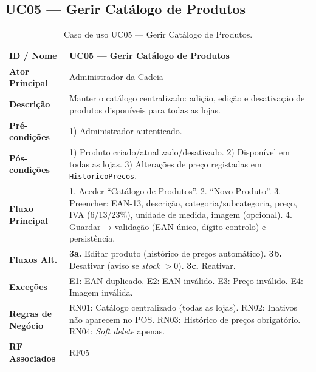 \documentclass[a4paper,12pt]{scrreprt}
\begin{document}
\subsection*{UC05 --- Gerir Catálogo de Produtos}
\begin{table}[H]
\centering\small
\begin{tabular}{|p{3cm}|p{11cm}|}
\hline
\textbf{ID / Nome} & UC05 --- Gerir Catálogo de Produtos \\
\hline
\textbf{Ator Principal} & Administrador da Cadeia \\
\hline
\textbf{Descrição} & Manter o catálogo centralizado: adição, edição e desativação de produtos disponíveis para todas as lojas. \\
\hline
\textbf{Pré-condições} & 1) Administrador autenticado. \\
\hline
\textbf{Pós-condições} & 1) Produto criado/atualizado/desativado. 2) Disponível em todas as lojas. 3) Alterações de preço registadas em \texttt{HistoricoPrecos}. \\
\hline
\textbf{Fluxo Principal} & 1. Aceder ``Catálogo de Produtos''. 2. ``Novo Produto''. 3. Preencher: EAN-13, descrição, categoria/subcategoria, preço, IVA (6/13/23\%), unidade de medida, imagem (opcional). 4. Guardar → validação (EAN único, dígito controlo) e persistência. \\
\hline
\textbf{Fluxos Alt.} & \textbf{3a.} Editar produto (histórico de preços automático). \textbf{3b.} Desativar (aviso se \textit{stock} $> 0$). \textbf{3c.} Reativar. \\
\hline
\textbf{Exceções} & E1: EAN duplicado. E2: EAN inválido. E3: Preço inválido. E4: Imagem inválida. \\
\hline
\textbf{Regras de Negócio} & RN01: Catálogo centralizado (todas as lojas). RN02: Inativos não aparecem no POS. RN03: Histórico de preços obrigatório. RN04: \textit{Soft delete} apenas. \\
\hline
\textbf{RF Associados} & RF05 \\
\hline
\end{tabular}
\caption{Caso de uso UC05 --- Gerir Catálogo de Produtos.}
\end{table}

\end{document}
